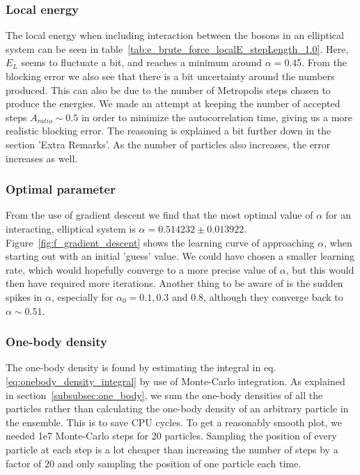 \documentclass[
    a4paper, aps, twocolumn, floatfix, superscriptaddress,
    nofootinbib]{revtex4-1}
\begin{document}
\subsubsection{Local energy}
The local energy when including interaction between the bosons in an elliptical system can be seen in table~\ref{tab:e_brute_force_localE_stepLength_1.0}. Here, $E_L$ seems to fluctuate a bit, and reaches a minimum around $\alpha = 0.45$. From the blocking error we also see that there is a bit uncertainty around the numbers produced. This can also be due to the number of Metropolis steps chosen to produce the energies. We made an attempt at keeping the number of accepted steps $A_{ratio}\sim 0.5$ in order to minimize the autocorrelation time, giving us a more realistic blocking error. The reasoning is explained a bit further down in the section 'Extra Remarks'. As the number of particles also increases, the error increases as well.

\subsubsection{Optimal parameter}
From the use of gradient descent we find that the most optimal value of $\alpha$ for an interacting, elliptical system is $\alpha = 0.514232\pm 0.013922$. Figure~\ref{fig:f_gradient_descent} shows the learning curve of approaching $\alpha$, when starting out with an initial 'guess' value. We could have chosen a smaller learning rate, which would hopefully converge to a more precise value of $\alpha$, but this would then have required more iterations. Another thing to be aware of is the sudden spikes in $\alpha$, especially for $\alpha_0 = 0.1, 0.3$ and 0.8, although they converge back to $\alpha \sim 0.51$.

\subsubsection{One-body density}
The one-body density is found by estimating the integral in eq. \eqref{eq:onebody_density_integral} by use of Monte-Carlo integration. As explained in section~\ref{subsubsec:one_body}, we sum the one-body densities of all the particles rather than calculating the one-body density of an arbitrary particle in the ensemble. This is to save CPU cycles. To get a reasonably smooth plot, we needed 1e7 Monte-Carlo steps for 20 particles. Sampling the position of every particle at each step is a lot cheaper than increasing the number of steps by a factor of $20$ and only sampling the position of one particle each time.
\end{document}
